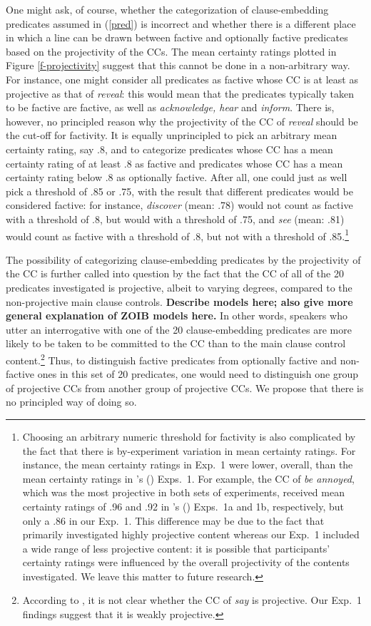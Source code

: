 \documentclass[11pt,fleqn]{article}
\newcommand{\6}{\mbox{$[\hspace*{-.6mm}[$}}
\newcommand{\9}{\mbox{$]\hspace*{-.6mm}]$}}
\newcommand{\citetpos}[1]{\citeauthor{#1}'s (\citeyear{#1})}
\begin{document}
One might ask, of course, whether the categorization of clause-embedding predicates assumed in (\ref{pred}) is incorrect and whether there is a different place in which a line can be drawn between factive and optionally factive predicates based on the projectivity of the CCs. The mean certainty ratings plotted in Figure \ref{f-projectivity} suggest that this cannot be done in a non-arbitrary way. For instance, one might consider all predicates as factive whose CC is at least as projective as that of {\em reveal}: this would mean that the predicates typically taken to be factive are factive, as well as {\em acknowledge, hear} and {\em inform}. There is, however, no principled reason why the projectivity of the CC of {\em reveal} should be the cut-off for factivity. It is equally unprincipled to pick an arbitrary mean certainty rating, say .8, and to categorize predicates whose CC has a mean certainty rating of at least .8 as factive and predicates whose CC has a mean certainty rating below .8 as optionally factive. After all, one could just as well pick a threshold of .85 or .75, with the result that different predicates would be considered factive: for instance, {\em discover} (mean: .78) would not count as factive with a threshold of .8, but would with a threshold of .75, and {\em see} (mean: .81) would count as factive with a threshold of .8, but not with a threshold of .85.\footnote{Choosing an arbitrary numeric threshold for factivity is also complicated by the fact that there is by-experiment variation in mean certainty ratings. For instance, the mean certainty ratings in Exp.~1 were lower, overall, than the mean certainty ratings in \citetpos{tbd-variability} Exps.~1. For example, the CC of {\em be annoyed}, which was the most projective in both sets of experiments, received mean certainty ratings of .96  and .92 in \citetpos{tbd-variability} Exps.~1a and 1b, respectively, but only a .86 in our Exp.~1. This difference may be due to the fact that \citet{tbd-variability} primarily investigated highly projective content whereas our Exp.~1 included a wide range of less projective content: it is possible that participants' certainty ratings were influenced by the overall projectivity of the contents investigated. We leave this matter to future research.}

The possibility of categorizing clause-embedding predicates by the projectivity of the CC is further called into question by the fact that the CC of all of the 20 predicates investigated is projective, albeit to varying degrees, compared to the non-projective main clause controls. {\bf Describe models here; also give more general explanation of ZOIB models here.} In other words, speakers who utter an interrogative with one of the 20 clause-embedding predicates are more likely to be taken to be committed to the CC than to the main clause control content.\footnote{According to \citet[1739]{spector-egre2015}, it is not clear whether the CC of {\em say} is projective. Our Exp.~1 findings suggest that it is weakly projective.}    Thus, to distinguish factive predicates from optionally factive and non-factive ones in this set of 20 predicates, one would need to distinguish one group of projective CCs from another group of projective CCs. We propose that there is no principled way of doing so.
\end{document}
